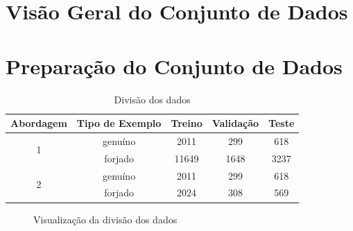 

\section{Visão Geral do Conjunto de Dados}



\section{Preparação do Conjunto de Dados}

\begin{table}[h!]
	\centering
	\caption{Divisão dos dados}
	\label{tab:divisao-dados}
	\begin{tabular}{c c c c c}
		\toprule
		\textbf{Abordagem} & \textbf{Tipo de Exemplo} & \textbf{Treino} & \textbf{Validação} & \textbf{Teste}\\
		\midrule
		\multirow{2}{*}{1} & genuíno & 2011 & 299 & 618 \\
     & forjado & 11649 & 1648 & 3237 \\
     \midrule
    \multirow{2}{*}{2} & genuíno & 2011 & 299 & 618   \\
     & forjado & 2024 & 308 & 569 \\
		\bottomrule
	\end{tabular}
\end{table}

\begin{figure}[h!]
  \centering
\caption{Visualização da divisão dos dados}
  \hfill
  \label{fig:divisao-dados}
\end{figure}

